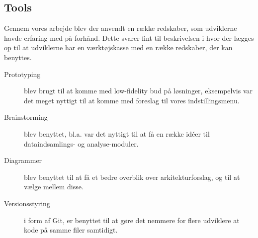 \subsection{Tools}
Gennem vores arbejde blev der anvendt en række redskaber, som udviklerne havde erfaring med på forhånd.
Dette svarer fint til beskrivelsen i \citet[Kapitel 7]{book:softwareinnovation} hvor der lægges op til at udviklerne har en værktøjskasse med en række redskaber, der kan benyttes.

\begin{description}
	\item[Prototyping] blev brugt til at komme med low-fidelity bud på løsninger, eksempelvis var det meget nyttigt til at komme med foreslag til vores indstillingsmenu.
	\item[Brainstorming] blev benyttet, bl.a. var det nyttigt til at få en række idéer til dataindsamlings- og analyse-moduler.
	\item[Diagrammer] blev benyttet til at få et bedre overblik over arkitekturforslag, og til at vælge mellem disse.
	\item[Versionsstyring] i form af Git, er benyttet til at gøre det nemmere for flere udviklere at kode på samme filer samtidigt.
\end{description}